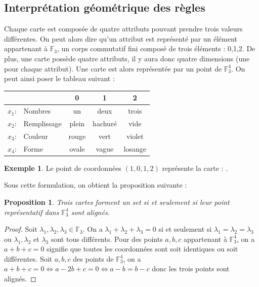 \documentclass[a4paper,12pt,titlepage]{article}
\theoremstyle{plain}
\newtheorem{prop}{Proposition}
\newcommand{\Ftrois}[1]{\mathbb{F}^#1_3}
\theoremstyle{definition}
\newtheorem{ex}{Exemple}
\begin{document}
\subsection{Interprétation géométrique des règles}
Chaque carte est composée de quatre attributs pouvant prendre trois valeurs différentes. On peut alors dire qu'un attribut est représenté par un élément appartenant  à $\mathbb{F}_3$, un corps commutatif fini composé de trois éléments : 0,1,2.
De plus, une carte possède quatre attributs, il y aura donc quatre dimensions (une pour chaque attribut). Une carte est alors représentée par un point de $\Ftrois{4}$.
On peut ainsi poser le tableau suivant :

\begin{center}
\begin{tabular}{r l | c c c }
 & & 0 & 1 & 2 \\
\hline
$x_1$: & Nombres     & un		& deux	  & trois 	\\
$x_2$: & Remplissage & plein 	& hachuré & vide 	\\
$x_3$: & Couleur     & rouge	& vert	  & violet 	\\
$x_4$: & Forme       & ovale	& vague	  & losange \\
\end{tabular}
\end{center}

\begin{ex}
Le point de coordonnées $(1,0,1,2)$ représente la carte : .
\end{ex}

Sous cette formulation, on obtient la proposition suivante :
\begin{prop}
Trois cartes forment un set si et seulement si leur point représentatif dans  $\Ftrois{4}$ sont alignés.
\end{prop}
\begin{proof}
Soit $\lambda_1,\lambda_2,\lambda_3 \in \mathbb{F}_3$. On a $\lambda_1 + \lambda_2 + \lambda_3 = 0$ si et seulement si $\lambda_1=\lambda_2=\lambda_3$ ou $\lambda_1,\lambda_2$ et $\lambda_3$ sont tous différents. Pour des points $a,b,c$ appartenant à  $\Ftrois{4}$, on a $a+b+c=0$ signifie que toutes les coordonnées sont soit identiques ou soit différentes.
Soit $a,b,c$ des points de  $\Ftrois{4}$, on a $a+b+c=0 \iff a-2b+c=0 \iff a-b=b-c$ donc les trois points sont alignés.
\end{proof}
\end{document}
